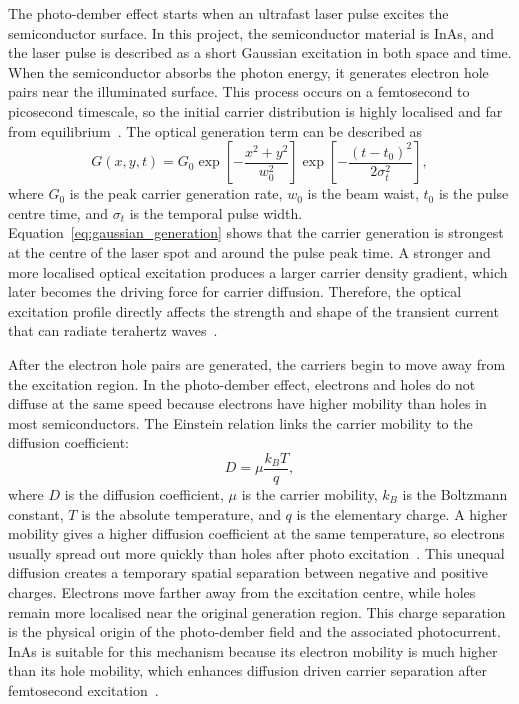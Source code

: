 \documentclass[12pt]{final_project_report}
\begin{document}
The photo-dember effect starts when an ultrafast laser pulse excites the semiconductor surface. In this project, the semiconductor material is InAs, and the laser pulse is described as a short Gaussian excitation in both space and time. When the semiconductor absorbs the photon energy, it generates electron hole pairs near the illuminated surface. This process occurs on a femtosecond to picosecond timescale, so the initial carrier distribution is highly localised and far from equilibrium~\cite{Tonouchi2020,Heroux2017}. The optical generation term can be described as
\begin{equation}
    G(x,y,t) = G_0
    \exp\left[-\frac{x^2+y^2}{w_0^2}\right]
    \exp\left[-\frac{(t-t_0)^2}{2\sigma_t^2}\right],
    \label{eq:gaussian_generation}
\end{equation}
where $G_0$ is the peak carrier generation rate, $w_0$ is the beam waist, $t_0$ is the pulse centre time, and $\sigma_t$ is the temporal pulse width. Equation~\ref{eq:gaussian_generation} shows that the carrier generation is strongest at the centre of the laser spot and around the pulse peak time. A stronger and more localised optical excitation produces a larger carrier density gradient, which later becomes the driving force for carrier diffusion. Therefore, the optical excitation profile directly affects the strength and shape of the transient current that can radiate terahertz waves~\cite{Tonouchi2020,NavarroCia2016}.

After the electron hole pairs are generated, the carriers begin to move away from the excitation region. In the photo-dember effect, electrons and holes do not diffuse at the same speed because electrons have higher mobility than holes in most semiconductors. The Einstein relation links the carrier mobility to the diffusion coefficient:
\begin{equation}
    D = \mu \frac{k_B T}{q},
    \label{eq:einstein_relation}
\end{equation}
where $D$ is the diffusion coefficient, $\mu$ is the carrier mobility, $k_B$ is the Boltzmann constant, $T$ is the absolute temperature, and $q$ is the elementary charge. A higher mobility gives a higher diffusion coefficient at the same temperature, so electrons usually spread out more quickly than holes after photo excitation~\cite{Heroux2017,Lu2022}. This unequal diffusion creates a temporary spatial separation between negative and positive charges. Electrons move farther away from the excitation centre, while holes remain more localised near the original generation region. This charge separation is the physical origin of the photo-dember field and the associated photocurrent. InAs is suitable for this mechanism because its electron mobility is much higher than its hole mobility, which enhances diffusion driven carrier separation after femtosecond excitation~\cite{Heroux2017,Lu2022}.
\end{document}

